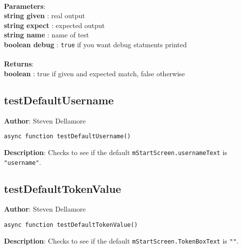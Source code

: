 \documentclass[12pt]{article}
\begin{document}
\textbf{\large{\\Parameters}}:\\
\textbf{string given }: real output\\
\textbf{string expect }: expected output\\
\textbf{string name }: name of test\\
\textbf{boolean debug }: \texttt{true} if you want debug statments printed\\\textbf{\large{\\Returns}}:\\\textbf{boolean }: true if given and expected match, false otherwise

\subsection{testDefaultUsername}
\textbf{Author}: Steven Dellamore 
\vspace*{1\baselineskip}
\begin{lstlisting}
async function testDefaultUsername()
\end{lstlisting} 
\vspace*{1\baselineskip}
\textbf{Description}: Checks to see if the default \texttt{mStartScreen.usernameText} is \texttt{"username"}. 



\subsection{testDefaultTokenValue}
\textbf{Author}: Steven Dellamore 
\vspace*{1\baselineskip}
\begin{lstlisting}
async function testDefaultTokenValue()
\end{lstlisting} 
\vspace*{1\baselineskip}
\textbf{Description}: Checks to see if the default \texttt{mStartScreen.TokenBoxText} is \texttt{""}. 
\end{document}
